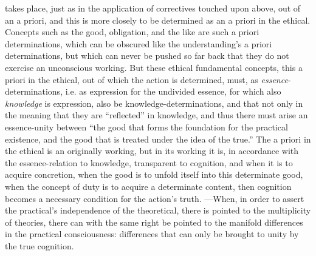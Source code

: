 \documentclass[12pt,a4paper]{book}
\begin{document}
takes place, just as in the application of correctives touched upon above, out of an a priori, and
this is more closely to be determined as an a priori in the ethical. Concepts such as the good,
obligation, and the like are such a priori determinations, which can be obscured like the
understanding's a priori determinations, but which can never be pushed so far back that they do not
exercise an unconscious working. But these ethical fundamental concepts, this a priori in the
ethical, out of which the action is determined, must, as \emph{essence}-determinations, i.e. as
expression for the undivided essence, for which also \emph{knowledge} is expression, also be
knowledge-determinations, and that not only in the meaning that they are ``reflected'' in knowledge,
and thus there must arise an essence-unity between ``the good that forms the foundation for the
practical existence, and the good that is treated under the idea of the true.'' The a priori in the
ethical is an originally working, but in its working it is, in accordance with the essence-relation to
knowledge, transparent to cognition, and when it is to acquire concretion, when the good is to unfold
itself into this determinate good, when the concept of duty is to acquire a determinate content, then
cognition becomes a necessary condition for the action's truth. ---When, in order to assert the
practical's independence of the theoretical, there is pointed to the multiplicity of theories, there
can with the same right be pointed to the manifold differences in the practical consciousness:
differences that can only be brought to unity by the true cognition.
\end{document}
